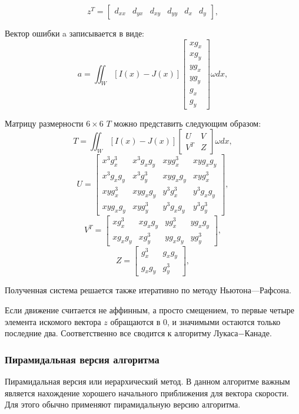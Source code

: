 $$z^T=\begin{bmatrix}
 d_{xx} & d_{yx} & d_{xy} & d_{yy} & d_x & d_y
\end{bmatrix},$$

Вектор ошибки a записывается в виде:
$$a=\iint_W [I(x)-J(x)]\begin{bmatrix}
xg_x\\
xg_y\\
yg_x\\
yg_y\\
g_x\\
g_y
\end{bmatrix}\omega dx,$$

Матрицу размерности $6 \times 6$ $T$ можно представить следующим образом:
$$T=\iint_W [I(x)-J(x)]\begin{bmatrix}
U & V\\
V^T & Z
\end{bmatrix}\omega dx,$$
$$U=\begin{bmatrix}
x^3 g^3_x & x^3 g_x g_y & x y g^3_x & x y g_x g_y \\
x^3g_xg_y & x^3g^3_y & xyg_xg_y & xyg^3_x \\
xyg^3_x & xyg_xg_y & y^3g^3_x & y^3g_xg_y \\
xyg_xg_y & xyg^3_y & y^3g_xg_y & y^3g^3_y
\end{bmatrix},$$
$$V^T=\begin{bmatrix}
xg^3_x & xg_xg_y & yg^3_x & yg_xg_y \\
xg_xg_y & xg^3_y & yg_xg_y & yg^3_y
\end{bmatrix},$$
$$Z=\begin{bmatrix}
g^3_x & g_xg_y \\
g_xg_y & g^3_y
\end{bmatrix},$$

Полученная система решается также итеративно по методу Ньютона—Рафсона.

Если движение считается не аффинным, а просто смещением, то первые четыре элемента искомого вектора $z$ обращаются в 0, и значимыми остаются только последние два. Соответственно все сводится к алгоритму Лукаса−Канаде.
\subsubsection{Пирамидальная версия алгоритма}
\label{subsec:pyramid}
Пирамидальная версия или иерархический метод. В данном алгоритме важным является нахождение хорошего начального приближения для вектора скорости. Для этого обычно применяют пирамидальную версию алгоритма. 

